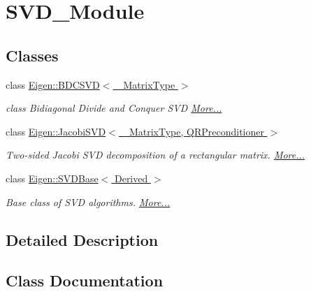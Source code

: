 \hypertarget{group___s_v_d___module}{}\section{S\+V\+D\+\_\+\+Module}
\label{group___s_v_d___module}
\subsection*{Classes}
\begin{DoxyCompactItemize}
\item 
class \hyperlink{group___s_v_d___module_class_eigen_1_1_b_d_c_s_v_d}{Eigen\+::\+B\+D\+C\+S\+V\+D$<$ \+\_\+\+Matrix\+Type $>$}
\begin{DoxyCompactList}\small\item\em class Bidiagonal Divide and Conquer S\+VD  \hyperlink{group___s_v_d___module_class_eigen_1_1_b_d_c_s_v_d}{More...}\end{DoxyCompactList}\item 
class \hyperlink{group___s_v_d___module_class_eigen_1_1_jacobi_s_v_d}{Eigen\+::\+Jacobi\+S\+V\+D$<$ \+\_\+\+Matrix\+Type, Q\+R\+Preconditioner $>$}
\begin{DoxyCompactList}\small\item\em Two-\/sided Jacobi S\+VD decomposition of a rectangular matrix.  \hyperlink{group___s_v_d___module_class_eigen_1_1_jacobi_s_v_d}{More...}\end{DoxyCompactList}\item 
class \hyperlink{group___s_v_d___module_class_eigen_1_1_s_v_d_base}{Eigen\+::\+S\+V\+D\+Base$<$ Derived $>$}
\begin{DoxyCompactList}\small\item\em Base class of S\+VD algorithms.  \hyperlink{group___s_v_d___module_class_eigen_1_1_s_v_d_base}{More...}\end{DoxyCompactList}\end{DoxyCompactItemize}


\subsection{Detailed Description}


\subsection{Class Documentation}
\label{class_eigen_1_1_b_d_c_s_v_d}
